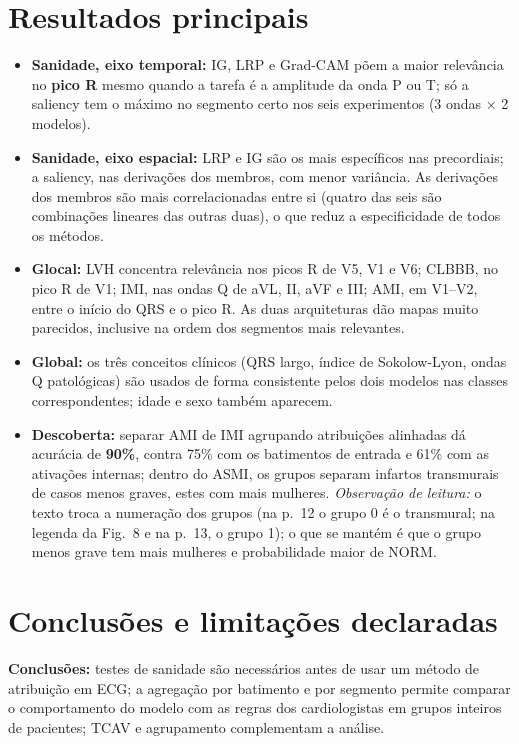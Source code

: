 \documentclass[11pt,a4paper]{article}
\begin{document}
\section{Resultados principais}
\begin{itemize}
\item \textbf{Sanidade, eixo temporal:} IG, LRP e Grad-CAM põem a maior relevância no \textbf{pico R} mesmo quando a tarefa é a amplitude da onda P ou T; só a saliency tem o máximo no segmento certo nos seis experimentos (3 ondas × 2 modelos).
\item \textbf{Sanidade, eixo espacial:} LRP e IG são os mais específicos nas precordiais; a saliency, nas derivações dos membros, com menor variância. As derivações dos membros são mais correlacionadas entre si (quatro das seis são combinações lineares das outras duas), o que reduz a especificidade de todos os métodos.
\item \textbf{Glocal:} LVH concentra relevância nos picos R de V5, V1 e V6; CLBBB, no pico R de V1; IMI, nas ondas Q de aVL, II, aVF e III; AMI, em V1--V2, entre o início do QRS e o pico R. As duas arquiteturas dão mapas muito parecidos, inclusive na ordem dos segmentos mais relevantes.
\item \textbf{Global:} os três conceitos clínicos (QRS largo, índice de Sokolow-Lyon, ondas Q patológicas) são usados de forma consistente pelos dois modelos nas classes correspondentes; idade e sexo também aparecem.
\item \textbf{Descoberta:} separar AMI de IMI agrupando atribuições alinhadas dá acurácia de \textbf{90\%}, contra 75\% com os batimentos de entrada e 61\% com as ativações internas; dentro do ASMI, os grupos separam infartos transmurais de casos menos graves, estes com mais mulheres. \textit{Observação de leitura:} o texto troca a numeração dos grupos (na p.~12 o grupo 0 é o transmural; na legenda da Fig.~8 e na p.~13, o grupo 1); o que se mantém é que o grupo menos grave tem mais mulheres e probabilidade maior de NORM.
\end{itemize}

\section{Conclusões e limitações declaradas}
\textbf{Conclusões:} testes de sanidade são necessários antes de usar um método de atribuição em ECG; a agregação por batimento e por segmento permite comparar o comportamento do modelo com as regras dos cardiologistas em grupos inteiros de pacientes; TCAV e agrupamento complementam a análise.
\end{document}

